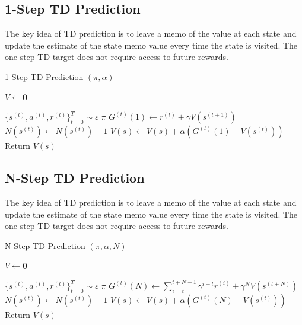 \documentclass[11pt]{article}
\begin{document}
\subsection{1-Step TD Prediction}
The key idea of TD prediction is to leave a memo of the value at each state and update the estimate of the state memo value every time the state is visited. 
The one-step TD target does not require access to future rewards.
\begin{algorithm}[H]
\caption{1-Step TD Prediction $(\pi, \alpha)$}
\label{algo:1TD}
\begin{algorithmic}[1]
\STATE $V \leftarrow \mathbf{0}$ \hfill
{}

\STATE $\{s^{(t)}, a^{(t)}, r^{(t)}\}_{t=0}^T \sim \varepsilon|\pi$ \hfill 
{}
\STATE $G^{(t)}(1) \leftarrow r^{(t)}+ \gamma V(s^{(t+1)})$ \hfill 
\STATE $N(s^{(t)}) \leftarrow N(s^{(t)})  + 1$ \hfill 
\STATE $V(s) \leftarrow V(s) + \alpha(G^{(t)}(1)-V(s^{(t)}))$  \hfill
\ENDFOR
\ENDFOR
\STATE Return $V(s)$  \hfill
\end{algorithmic}
\end{algorithm}

\subsection{N-Step TD Prediction}
The key idea of TD prediction is to leave a memo of the value at each state and update the estimate of the state memo value every time the state is visited. 
The one-step TD target does not require access to future rewards.
\begin{algorithm}[H]
\caption{N-Step TD Prediction $(\pi, \alpha, N)$}
\label{algo:NTD}
\begin{algorithmic}[1]
\STATE $V \leftarrow \mathbf{0}$ \hfill
{}

\STATE $\{s^{(t)}, a^{(t)}, r^{(t)}\}_{t=0}^T \sim \varepsilon|\pi$ \hfill 
{}
\STATE $G^{(t)}(N) \leftarrow \sum_{i=t}^{t+N-1} \gamma^{i-t} r^{(i)}+ \gamma^N V(s^{(t+N)})$ \hfill 
\STATE $N(s^{(t)}) \leftarrow N(s^{(t)})  + 1$ \hfill 
\STATE $V(s) \leftarrow V(s) + \alpha(G^{(t)}(N)-V(s^{(t)}))$  \hfill
\ENDFOR
\ENDFOR
\STATE Return $V(s)$  \hfill
\end{algorithmic}
\end{algorithm}
\end{document}
